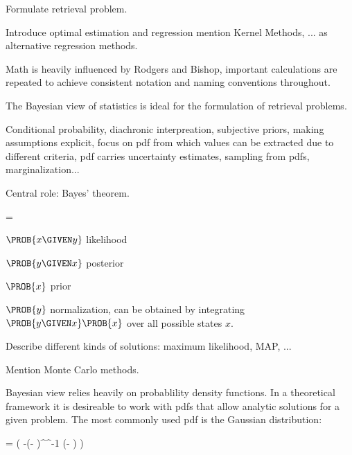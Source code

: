 Formulate retrieval problem.

Introduce optimal estimation and regression mention Kernel Methods, ... as
alternative regression methods.

Math is heavily influenced by Rodgers and Bishop, important calculations are
repeated to achieve consistent notation and naming conventions throughout.

\startsection[title={Bayesian Statistics}]

    The Bayesian view of statistics is ideal for the formulation of retrieval
    problems. 

    Conditional probability, diachronic interpreation, subjective priors,
    making assumptions explicit, focus on pdf from which values can be
    extracted due to different criteria, pdf carries uncertainty estimates,
    sampling from pdfs, marginalization...

    Central role: Bayes' theorem.
    
    \startformula
         = 
    \stopformula

    $\PROB{x \GIVEN y}$ likelihood

    $\PROB{y \GIVEN x}$ posterior

    $\PROB{x}$ prior

    $\PROB{y}$ normalization, can be obtained by integrating $\PROB{y \GIVEN x}\PROB{x}$
    over all possible states $x$.

     {}

    Describe different kinds of solutions: maximum likelihood, MAP, ...

    Mention Monte Carlo methods.

\stopsection

\startsection[title=The Multivariate Gaussian Distribution]

    Bayesian view relies heavily on probablility density functions. In a
    theoretical framework it is desireable to work with pdfs that allow
    analytic solutions for a given problem. The most commonly used pdf is the
    Gaussian distribution:

    \placeformula[eq:gaussian]
    \startformula
        \GAUSS{\VECX}{\MEANVEC}{\COVMAT}
        = 
          \exp \left( -(\VECX - \MEANVEC)^\top \COVMAT^{-1} (\VECX - \MEANVEC) \right)
    \stopformula

